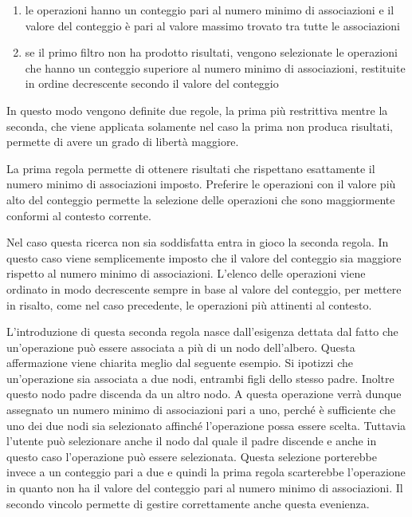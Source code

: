 \begin{enumerate}
	\item
	le operazioni hanno un conteggio pari al numero minimo di associazioni e il valore del conteggio è pari al valore massimo trovato tra tutte le associazioni
	\item
	se il primo filtro non ha prodotto risultati, vengono selezionate le operazioni che hanno un conteggio superiore al numero minimo di associazioni, restituite in ordine decrescente secondo il valore del conteggio
\end{enumerate}

In questo modo vengono definite due regole, la prima più restrittiva mentre la seconda, che viene applicata solamente nel caso la prima non produca risultati, permette di avere un grado di libertà maggiore.

La prima regola permette di ottenere risultati che rispettano esattamente il numero minimo di associazioni imposto. Preferire le operazioni con il valore più alto del conteggio permette la selezione delle operazioni che sono maggiormente conformi al contesto corrente.

Nel caso questa ricerca non sia soddisfatta entra in gioco la seconda regola. In questo caso viene semplicemente imposto che il valore del conteggio sia maggiore rispetto al numero minimo di associazioni. L'elenco delle operazioni viene ordinato in modo decrescente sempre in base al valore del conteggio, per mettere in risalto, come nel caso precedente, le operazioni più attinenti al contesto.

L'introduzione di questa seconda regola nasce dall'esigenza dettata dal fatto che un'operazione può essere associata a più di un nodo dell'albero. Questa affermazione viene chiarita meglio dal seguente esempio. Si ipotizzi che un'operazione sia associata a due nodi, entrambi figli dello stesso padre. Inoltre questo nodo padre discenda da un altro nodo. A questa operazione verrà dunque assegnato un numero minimo di associazioni pari a uno, perché è sufficiente che uno dei due nodi sia selezionato affinché l'operazione possa essere scelta. Tuttavia l'utente può selezionare anche il nodo dal quale il padre discende e anche in questo caso l'operazione può essere selezionata. Questa selezione porterebbe invece a un conteggio pari a due e quindi la prima regola scarterebbe l'operazione in quanto non ha il valore del conteggio pari al numero minimo di associazioni. Il secondo vincolo permette di gestire correttamente anche questa evenienza.

